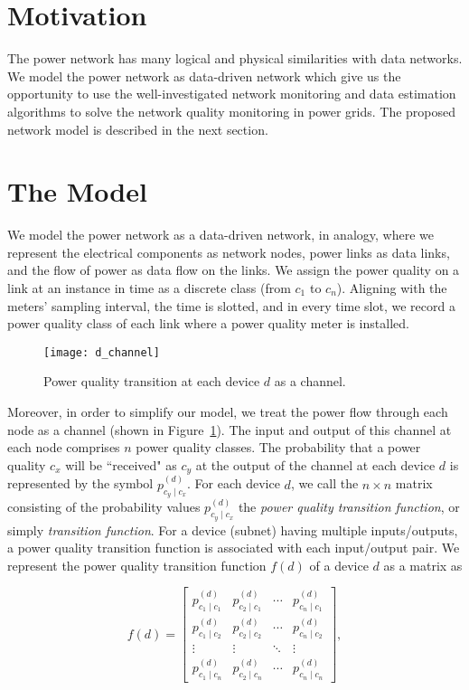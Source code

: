 \label{chap:networkModel}
\section{Motivation}
The power network has many logical and physical similarities with data networks. We model the power network as data-driven network which give us the opportunity to use the well-investigated network monitoring and data estimation algorithms to solve the network quality monitoring in power grids. The proposed network model is described in the next section.

\section{The Model}
We model the power network as a data-driven network, in analogy, where we represent the electrical components as network nodes, power links as data links, and the flow of power as data flow on the links. We assign the power quality on a link at an instance in time as a discrete class (from $c_1$ to $c_n$). Aligning with the meters' sampling interval, the time is slotted, and in every time slot, we record a power quality class of each link where a power quality meter is installed. 

\begin{figure}[!t]
    \centering
    \texttt{[image: d\_channel]}
    \caption{Power quality transition at each device $d$ as a channel.}
    \label{fig:d_channel}
\end{figure}

Moreover, in order to simplify our model, we treat the power flow through each node as a channel (shown in Figure~\ref{fig:d_channel}). The input and output of this channel at each node comprises $n$ power quality classes. The probability that a power quality $c_x$ will be ``received" as $c_y$ at the output of the channel at each device $d$ is represented by the symbol $p_{c_y  \mid c_x}^{(d)}$. For each device $d$, we call the $n\times n$ matrix consisting of the probability values  $p_{c_y  \mid c_x}^{(d)}$ the \emph{power quality transition function}, or simply \emph{transition function}. For a device (subnet) having multiple inputs/outputs, a power quality transition function is associated with each input/output pair. We represent the power quality transition function $f(d)$ of a device $d$ as a matrix as

\begin{equation}
f(d) = \left[\begin{array}{cccc} p_{c_1 \mid c_1}^{(d)} & p_{c_2 \mid c_1}^{(d)} & \cdots & p_{c_n \mid c_1}^{(d)}\\
p_{c_1 \mid c_2}^{(d)} & p_{c_2 \mid c_2}^{(d)} & \cdots & p_{c_n \mid c_2}^{(d)}\\
\vdots & \vdots& \ddots & \vdots\\
p_{c_1 \mid c_n}^{(d)} & p_{c_2 \mid c_n}^{(d)} & \cdots & p_{c_n \mid c_n}^{(d)}
\end{array}\right],
\label{eqn:pqf}
\end{equation}

